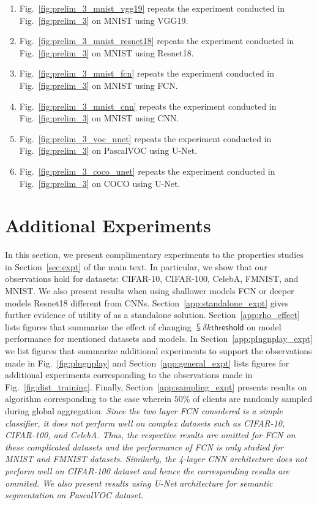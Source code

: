 \begin{enumerate}[leftmargin=5mm]
    \item Fig.~\ref{fig:prelim_3_mnist_vgg19} repeats the experiment conducted in Fig.~\ref{fig:prelim_3} on MNIST using VGG19.
    \item Fig.~\ref{fig:prelim_3_mnist_resnet18} repeats the experiment conducted in Fig.~\ref{fig:prelim_3} on MNIST using Resnet18.
    \item Fig.~\ref{fig:prelim_3_mnist_fcn} repeats the experiment conducted in Fig.~\ref{fig:prelim_3} on MNIST using FCN.
    \item Fig.~\ref{fig:prelim_3_mnist_cnn} repeats the experiment conducted in Fig.~\ref{fig:prelim_3} on MNIST using CNN.
    
    \item Fig.~\ref{fig:prelim_3_voc_unet} repeats the experiment conducted in Fig.~\ref{fig:prelim_3} on PascalVOC using U-Net.
    \item Fig.~\ref{fig:prelim_3_coco_unet} repeats the experiment conducted in Fig.~\ref{fig:prelim_3} on COCO using U-Net.
\end{enumerate}



\section{Additional {\algName} Experiments}
\label{app:addl_lbgm_expt}

In this section, we present complimentary experiments to the properties studies in Section~\ref{sec:expt} of the main text. In particular, we show that our observations hold for datasets: CIFAR-10, CIFAR-100, CelebA, FMNIST, and MNIST. We also present results when using shallower models FCN or deeper models Resnet18 different from CNNs. Section~\ref{app:standalone_expt} gives further evidence of utility of {\algName} as a standalone solution. Section~\ref{app:rho_effect} lists figures that summarize the effect of changing $\subsup{\delta}{k}{\mathsf{threshold}}$ on model performance for mentioned datasets and models. In Section~\ref{app:plugnplay_expt} we list figures that summarize additional experiments to support the observations made in Fig.~\ref{fig:plugnplay} and Section~\ref{app:general_expt} lists figures for additional experiments corresponding to the observations made in Fig.~\ref{fig:dist_training}. Finally, Section~\ref{app:sampling_expt} presents results  on {\algName} algorithm corresponding to the case wherein $50\%$ of clients are randomly sampled during global aggregation. \textit{Since the two layer FCN considered is a simple classifier, it does not perform well on complex datasets such as CIFAR-10, CIFAR-100, and CelebA. Thus, the respective results are omitted for FCN on these complicated datasets and the performance of FCN is only studied for MNIST and FMNIST datasets. Similarly, the 4-layer CNN architecture does not perform well on CIFAR-100 dataset and hence the corresponding results are ommited. We also present results using U-Net architecture for semantic segmentation on PascalVOC dataset.}


